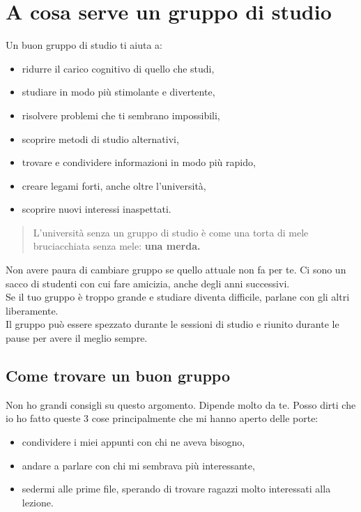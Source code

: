 \documentclass[18pt]{extarticle}
\begin{document}
\section{A cosa serve un gruppo di studio}
Un buon gruppo di studio ti aiuta a:
\begin{itemize}
\item ridurre il carico cognitivo di quello che studi,
\item studiare in modo più stimolante e divertente,
\item risolvere problemi che ti sembrano impossibili,
\item scoprire metodi di studio alternativi,
\item trovare e condividere informazioni in modo più rapido,
\item creare legami forti, anche oltre l'università,
\item scoprire nuovi interessi inaspettati.
\end{itemize}
\begin{quote}
L'università senza un gruppo di studio è come una torta di mele bruciacchiata senza mele: \textbf{una merda.}
\end{quote}
Non avere paura di cambiare gruppo se quello attuale non fa per te. Ci sono un sacco di studenti con cui fare amicizia, anche degli anni successivi.\\
Se il tuo gruppo è troppo grande e studiare diventa difficile, parlane con gli altri liberamente.\\
Il gruppo può essere spezzato durante le sessioni di studio e riunito durante le pause per avere il meglio sempre.


\subsection{Come trovare un buon gruppo}
Non ho grandi consigli su questo argomento. Dipende molto da te.
Posso dirti che io ho fatto queste 3 cose principalmente che mi hanno aperto delle porte:
\begin{itemize}
\item condividere i miei appunti con chi ne aveva bisogno, 
\item andare a parlare con chi mi sembrava più interessante,
\item sedermi alle prime file, sperando di trovare ragazzi molto interessati alla lezione.
\end{itemize}

\clearpage
\end{document}
